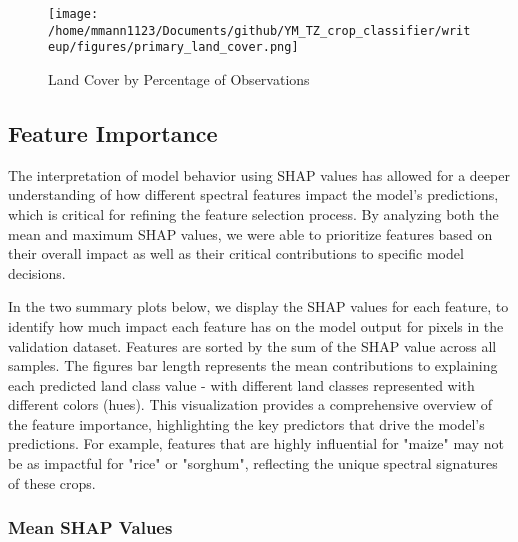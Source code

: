 \documentclass[journal]{IEEEtran}
\begin{document}
\begin{figure}[!t]
   \centering   \texttt{[image: /home/mmann1123/Documents/github/YM\_TZ\_crop\_classifier/writeup/figures/primary\_land\_cover.png]} %
   \caption{Land Cover by Percentage of Observations}
   \label{fig:lc_percentages} %
\end{figure}

\subsection{Feature Importance}

The interpretation of model behavior using SHAP values has allowed for a deeper understanding of how different spectral features impact the model's predictions, which is critical for refining the feature selection process. By analyzing both the mean and maximum SHAP values, we were able to prioritize features based on their overall impact as well as their critical contributions to specific model decisions.

In the two summary plots below, we display the SHAP values for each feature, to identify how much impact each feature has on the model output for pixels in the validation dataset. Features are sorted by the sum of the SHAP value across all samples. The figures bar length represents the mean contributions to explaining each predicted land class value - with different land classes represented with different colors (hues). This visualization provides a comprehensive overview of the feature importance, highlighting the key predictors that drive the model's predictions. For example, features that are highly influential for "maize" may not be as impactful for "rice" or "sorghum", reflecting the unique spectral signatures of these crops.

\subsubsection{Mean SHAP Values}
\end{document}
